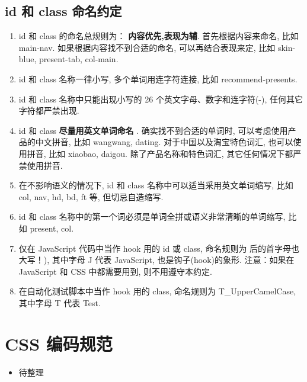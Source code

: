 \documentclass[letterpaper,10pt,english]{sphinxmanual}
\begin{document}
\subsection{id 和 class 命名约定}
\label{styleguide/common-conventions:id-class}\begin{enumerate}
\item {}
id 和 class 的命名总规则为： \textbf{内容优先,表现为辅}. 首先根据内容来命名, 比如 main-nav. 如果根据内容找不到合适的命名, 可以再结合表现来定, 比如 skin-blue, present-tab, col-main.

\item {}
id 和 class 名称一律小写, 多个单词用连字符连接, 比如 recommend-presents.

\item {}
id 和 class 名称中只能出现小写的 26 个英文字母、数字和连字符(-), 任何其它字符都严禁出现.

\item {}
id 和 class \textbf{尽量用英文单词命名} . 确实找不到合适的单词时, 可以考虑使用产品的中文拼音, 比如 wangwang, dating. 对于中国以及淘宝特色词汇, 也可以使用拼音, 比如 xiaobao, daigou. 除了产品名称和特色词汇, 其它任何情况下都严禁使用拼音.

\item {}
在不影响语义的情况下, id 和 class 名称中可以适当采用英文单词缩写, 比如 col, nav, hd, bd, ft 等, 但切忌自造缩写.

\item {}
id 和 class 名称中的第一个词必须是单词全拼或语义非常清晰的单词缩写, 比如 present, col.

\item {}
仅在 JavaScript 代码中当作 hook 用的 id 或 class, 命名规则为  后的首字母也大写！), 其中字母 J 代表 JavaScript, 也是钩子(hook)的象形. 注意：如果在 JavaScript 和 CSS 中都需要用到, 则不用遵守本约定.

\item {}
在自动化测试脚本中当作 hook 用的 class, 命名规则为 T\_UpperCamelCase, 其中字母 T 代表 Test.

\end{enumerate}


\section{CSS 编码规范}
\label{styleguide/css-coding-style::doc}\label{styleguide/css-coding-style:styleguide-csscodingstyle}\label{styleguide/css-coding-style:css}\begin{itemize}
\item {}
待整理

\end{itemize}
\end{document}
